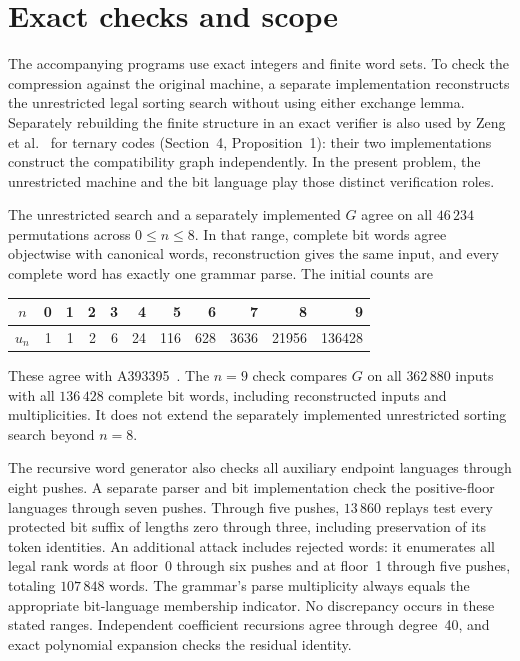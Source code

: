 \documentclass[11pt,a4paper]{article}
\theoremstyle{remark}
\begin{document}
\section{Exact checks and scope}\label{sec:checks}

The accompanying programs use exact integers and finite word sets.
To check the compression against the original machine, a separate
implementation reconstructs the unrestricted legal sorting search without
using either exchange lemma. Separately rebuilding the finite structure
in an exact verifier is also used by Zeng et al.~\cite{ZengEtAl2026}
for ternary codes (Section~4, Proposition~1): their two implementations
construct the compatibility graph independently. In the present problem,
the unrestricted machine and the bit language play those distinct
verification roles.

The unrestricted search and a separately implemented $G$ agree on all
$46\,234$ permutations across $0\leq n\leq8$. In that range, complete
bit words agree objectwise with canonical words, reconstruction gives
the same input, and every complete word has exactly one grammar parse.
The initial counts are
\begin{center}
\small
\begin{tabular}{c*{10}{r}}
\toprule
$n$ & 0&1&2&3&4&5&6&7&8&9\\
\midrule
$u_n$ &1&1&2&6&24&116&628&3636&21956&136428\\
\bottomrule
\end{tabular}
\end{center}
These agree with A393395~\cite{OEIS393395}. The $n=9$ check compares $G$
on all $362\,880$ inputs with all $136\,428$ complete bit words, including
reconstructed inputs and multiplicities. It does not extend the
separately implemented unrestricted sorting search beyond $n=8$.

The recursive word generator also checks all auxiliary endpoint languages
through eight pushes. A separate parser and bit implementation check the
positive-floor languages through seven pushes. Through five pushes,
$13\,860$ replays test every protected bit suffix of lengths zero through
three, including preservation of its token identities. An additional
attack includes rejected words: it enumerates all legal rank words at
floor~0 through six pushes and at floor~1 through five pushes, totaling
$107\,848$ words. The grammar's parse multiplicity always equals the
appropriate bit-language membership indicator. No discrepancy occurs in
these stated ranges. Independent coefficient recursions agree through
degree~40, and exact polynomial expansion checks the residual identity.
\end{document}
